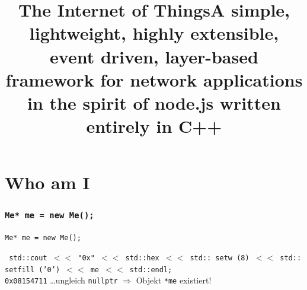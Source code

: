 ﻿\title[IoT]{\Huge The Internet of Things}
\def\inserttitlehead{\insertdegreehead{} | \insertshorttitle}

\def\insertlecturepartnumbername{}


\title[IoT]{\large A \alert{simple}, lightweight, highly extensible, event driven, layer-based framework for network applications in the spirit of \alert{node}.js written entirely in \alert{C}++}


\part{Who am I}
\section{\tt{Me* me = new Me();}}

\begin{frame}[fragile]{\tt{Me* me = new Me();}}
  \begin{center}
    \Large\texttt{\color{magenta} std\color{black}::\color{orange}cout \color{black} $<<$  \color{darkgreen} "0x"{} \color{black}$<<$ \color{magenta} std\color{black}::\color{cyan}hex \color{black} $<<$ \color{magenta} std\color{black}::\color{cyan} setw\color{black} (8) $<<$ \color{magenta} std\color{black}::\color{cyan} setfill\color{black} ('0') $<<$ \color{fh-ooe-red}me \color{black} $<<$ \color{magenta}std\color{black}::\color{cyan}endl;}\\
    \vskip0.7cm
    \texttt{\color{blue}0x08154711}
    \vskip0.7cm
    \ldots ungleich \texttt{\color{brown}nullptr} $\Rightarrow$ Objekt \texttt{*me} existiert!
  \end{center}
\end{frame}

